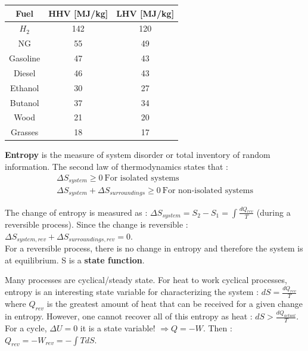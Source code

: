 \documentclass[../main.tex]{subfiles}
\begin{document}
\begin{table}[hbt!]
    \centering
    \begin{tabular}{c|c|c}
        Fuel & HHV [MJ/kg] & LHV [MJ/kg] \\ \hline
        $H_2$ & 142 & 120\\
        NG & 55 & 49\\
        Gasoline & 47& 43\\
        Diesel & 46 & 43\\
        Ethanol & 30 & 27\\
        Butanol & 37 & 34\\
        Wood & 21 & 20\\
        Grasses & 18 & 17\\
    \end{tabular}
\end{table}


\textbf{Entropy} is the measure of system disorder or total inventory of random information. The second law of thermodynamics states that : \begin{equation}
\begin{gathered}
    \Delta S_{system} \geq 0 \: \text{For isolated systems}\\
    \Delta S_{system} + \Delta S_{surroundings} \geq 0 \: \text{For non-isolated systems}
    \end{gathered}
\end{equation}

The change of entropy is measured as : $\Delta S_{system} = S_2-S_1 = \int \frac{dQ_{rev}}{T}$ (during a reversible process). Since the change is reversible : $\Delta S_{system,rev} + \Delta S_{surroundings,rev} = 0$.\\
For a reversible process, there is no change in entropy and therefore the system is at equilibrium. S is a \textbf{state function}.

Many processes are cyclical/steady state. For heat to work cyclical processes, entropy is an interesting state variable for characterizing the system : $dS = \frac{dQ_{rev}}{T}$ where $Q_{rev}$ is the greatest amount of heat that can be received for a given change in entropy. However, one cannot recover all of this entropy as heat : $dS > \frac{dQ_{actual}}{T}$.\\

For a cycle, $\Delta U = 0$ it is a state variable! $\Rightarrow Q = -W$. Then : $Q_{rev} = -W_{rev} = -\int T dS$.\\
\end{document}
